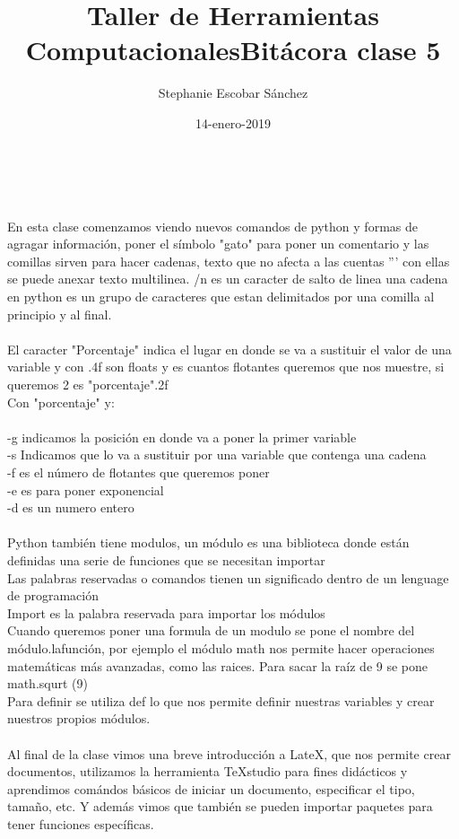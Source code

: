 \documentclass [letterpaper, 12 pts, oneside]{article}
\title{\Huge Taller de Herramientas Computacionales}
\author{Stephanie Escobar Sánchez}
\date{14-enero-2019}
\begin{document}
	\maketitle

	\newpage
	
	\title{\Huge Bitácora clase 5} \\
	\\
	En esta clase comenzamos viendo nuevos comandos de python y formas de agragar información, poner el símbolo "gato" para poner un comentario y las comillas sirven para hacer cadenas, texto que no afecta a las cuentas ''' con ellas se puede anexar texto multilinea. /n es un caracter de salto de linea una cadena en python es un grupo de caracteres que estan delimitados por una comilla al principio y al final.\\
	\\
	El caracter "Porcentaje" indica el lugar en donde se va a sustituir el valor de una variable y con .4f son floats y es cuantos flotantes queremos que nos muestre, si queremos 2 es "porcentaje".2f \\
	Con "porcentaje" y:\\
	\\
	-g indicamos la posición en donde va a poner la primer variable \\
	-s Indicamos que lo va a sustituir por una variable que contenga una cadena \\
	-f es el número de flotantes que queremos poner \\
	-e es para poner exponencial\\
	-d es un numero entero\\
	\\

	Python también tiene modulos, un módulo es una biblioteca donde están definidas una serie de funciones que se necesitan importar\\ 
	Las palabras reservadas o comandos tienen un significado dentro de un lenguage de programación \\
	Import es la palabra reservada para importar los módulos\\
	
	Cuando queremos poner una formula de un modulo se pone el nombre del módulo.lafunción, por ejemplo el módulo math nos permite hacer operaciones matemáticas más avanzadas, como las raices. Para sacar la raíz de 9 se pone\\
	math.squrt (9)\\
	
	Para definir se utiliza def lo que nos permite definir nuestras variables y crear nuestros propios módulos.\\
	\\
	Al final de la clase vimos una breve introducción a LateX, que nos permite crear documentos, utilizamos la herramienta TeXstudio para fines didácticos y aprendimos comándos básicos de iniciar un documento, especificar el tipo, tamaño, etc. Y además vimos que también se pueden importar paquetes para tener funciones específicas.
	
		
\end{document}
